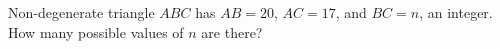 Non-degenerate triangle $ABC$ has $AB=20$, $AC=17$, and $BC=n$, an integer. How many possible values of $n$ are there?